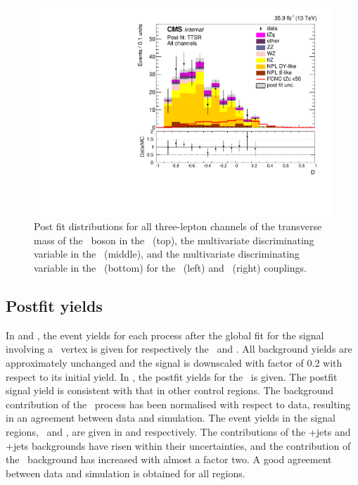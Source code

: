 \begin{figure}[htbp]
	\includegraphics[width=0.49\linewidth]{6_Search/Figures/ZctFit/shapes_fit_s_4_all_error_trial.pdf}
	\caption{Post fit distributions for all three-lepton channels of the transverse mass of the \PW\ boson in the \WZCR\ (top), the multivariate discriminating variable in the \STSR\ (middle), and the multivariate discriminating variable in the \TTSR\ (bottom) for the \Zut\ (left) and \Zct\ (right) couplings. }
	\label{fig:shapesfitALL}
\end{figure}

\clearpage
\subsection{Postfit yields}
\label{sec:postfityields}
In  and , the  event yields for each process after the global fit for the signal involving a \Zut\ vertex is given for respectively the \STCR\ and \TTCR. All background yields are approximately unchanged and the signal is downscaled with factor of 0.2 with respect to its initial yield. In , the postfit yields for the \WZCR\ is given. The postfit signal yield is consistent with that in other control regions. The background contribution of the \NPL\ process has been normalised with respect to data, resulting in an agreement between data and simulation. The event yields in the signal regions, \STSR\ and \TTSR, are given in  and  respectively. The contributions of the \WZ+jets and \ttZ+jets backgrounds have risen within their uncertainties, and the contribution of the \NPL\ background has increased with almost a factor two. A good agreement between data and simulation is obtained for all regions. 

